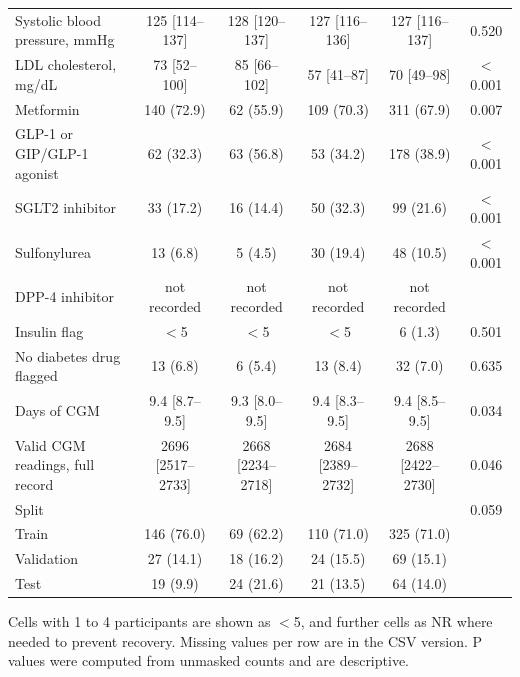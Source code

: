 \begin{table}[htbp]
\begin{tabular}{lccccc}
Systolic blood pressure, mmHg & 125 [114--137] & 128 [120--137] & 127 [116--136] & 127 [116--137] & 0.520 \\
LDL cholesterol, mg/dL & 73 [52--100] & 85 [66--102] & 57 [41--87] & 70 [49--98] & $<$0.001 \\
Metformin & 140 (72.9) & 62 (55.9) & 109 (70.3) & 311 (67.9) & 0.007 \\
GLP-1 or GIP/GLP-1 agonist & 62 (32.3) & 63 (56.8) & 53 (34.2) & 178 (38.9) & $<$0.001 \\
SGLT2 inhibitor & 33 (17.2) & 16 (14.4) & 50 (32.3) & 99 (21.6) & $<$0.001 \\
Sulfonylurea & 13 (6.8) & 5 (4.5) & 30 (19.4) & 48 (10.5) & $<$0.001 \\
DPP-4 inhibitor & not recorded & not recorded & not recorded & not recorded &  \\
Insulin flag & $<$5 & $<$5 & $<$5 & 6 (1.3) & 0.501 \\
No diabetes drug flagged & 13 (6.8) & 6 (5.4) & 13 (8.4) & 32 (7.0) & 0.635 \\
Days of CGM & 9.4 [8.7--9.5] & 9.3 [8.0--9.5] & 9.4 [8.3--9.5] & 9.4 [8.5--9.5] & 0.034 \\
Valid CGM readings, full record & 2696 [2517--2733] & 2668 [2234--2718] & 2684 [2389--2732] & 2688 [2422--2730] & 0.046 \\
Split &  &  &  &  & 0.059 \\
\hspace{1em}Train & 146 (76.0) & 69 (62.2) & 110 (71.0) & 325 (71.0) &  \\
\hspace{1em}Validation & 27 (14.1) & 18 (16.2) & 24 (15.5) & 69 (15.1) &  \\
\hspace{1em}Test & 19 (9.9) & 24 (21.6) & 21 (13.5) & 64 (14.0) &  \\
\bottomrule
\end{tabular}
\par\smallskip
\begin{minipage}{\linewidth}\scriptsize
Cells with 1 to 4 participants are shown as $<$5, and further cells as NR where needed to prevent recovery. Missing values per row are in the CSV version. P values were computed from unmasked counts and are descriptive.
\end{minipage}
\end{table}
